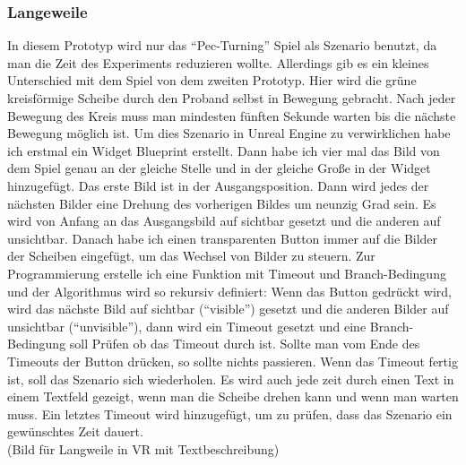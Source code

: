 \subsubsection{Langeweile} \label{langeweile-4}





In diesem Prototyp wird nur das ``Pec-Turning'' Spiel als Szenario benutzt, da man die Zeit des Experiments reduzieren wollte. Allerdings gib es ein kleines Unterschied mit dem Spiel von dem zweiten Prototyp. Hier wird die grüne kreisförmige Scheibe durch den Proband selbst in Bewegung gebracht. Nach jeder Bewegung des Kreis muss man mindesten fünften Sekunde warten bis die nächste Bewegung möglich ist. 
 Um dies Szenario in Unreal Engine zu verwirklichen habe ich erstmal ein Widget Blueprint erstellt. Dann habe ich vier mal das Bild von dem Spiel genau an der gleiche Stelle und in der gleiche Große in der Widget hinzugefügt. Das erste Bild ist in der Ausgangsposition. Dann wird jedes der nächsten Bilder eine Drehung des vorherigen Bildes um neunzig Grad sein. Es wird von Anfang an das Ausgangsbild auf sichtbar gesetzt und die anderen auf unsichtbar. Danach habe ich einen transparenten Button immer auf die Bilder der Scheiben eingefügt, um das Wechsel von Bilder zu steuern. Zur Programmierung erstelle ich eine Funktion mit Timeout und Branch-Bedingung und der Algorithmus wird so rekursiv definiert:  Wenn das Button gedrückt wird, wird das nächste Bild auf sichtbar (``visible'') gesetzt und die anderen Bilder auf unsichtbar (``unvisible''), dann wird ein Timeout gesetzt und eine Branch-Bedingung soll Prüfen ob das Timeout durch ist. Sollte man vom Ende des Timeouts der Button drücken, so sollte nichts passieren. Wenn das Timeout fertig ist, soll das Szenario sich wiederholen. Es wird auch jede zeit durch einen Text in einem Textfeld gezeigt, wenn man die Scheibe drehen kann und wenn man warten muss. Ein letztes Timeout wird hinzugefügt, um zu prüfen, dass das Szenario ein gewünschtes Zeit dauert. \\

(Bild für Langweile in VR mit Textbeschreibung)